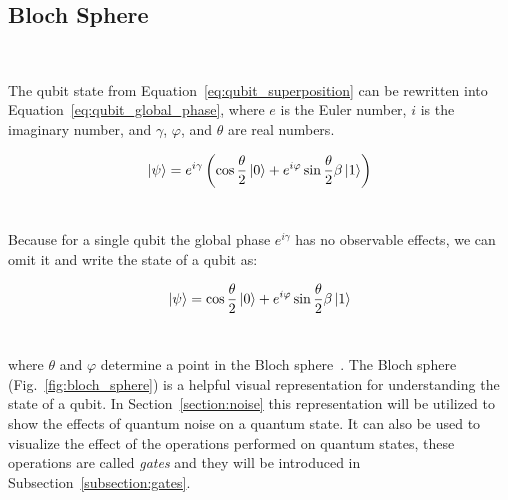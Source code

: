 \subsection{Bloch Sphere}\label{subsection:bloch} \

The qubit state from Equation~\ref{eq:qubit_superposition} can be
rewritten into Equation~\ref{eq:qubit_global_phase}, where \(e\)
is the Euler number, \(i\) is the imaginary number, and \(\gamma\),
\(\varphi\), and \(\theta\) are real numbers. \

\begin{equation}\label{eq:qubit_global_phase}
  \ket{\psi} = e^{i\gamma} \left( \cos{\frac{\theta}{2}}\ket{0} + e^{i\varphi}\sin{\frac{\theta}{2}}\beta\ket{1} \right)
\end{equation} \

Because for a single qubit the global phase \(e^{i\gamma}\) has no
observable effects, we can omit it and write the state of a qubit as: \

\begin{equation}\label{eq:qubit_bloch}
  \ket{\psi} = \cos{\frac{\theta}{2}}\ket{0} + e^{i\varphi}\sin{\frac{\theta}{2}}\beta\ket{1}
\end{equation} \

where \(\theta\) and \(\varphi\) determine a point in the Bloch
sphere~\cite{bloch_nuclear_1946}. The Bloch sphere (Fig.~\ref{fig:bloch_sphere})
is a helpful visual representation for understanding the state of a
qubit. In Section~\ref{section:noise} this representation will be
utilized to show the effects of quantum noise on a quantum state. It
can also be used to visualize the effect of the operations performed
on quantum states, these operations are called \textit{gates} and 
they will be introduced in Subsection~\ref{subsection:gates}. \


